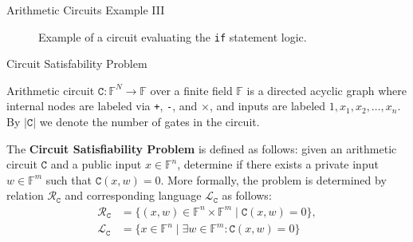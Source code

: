 \documentclass{beamer}
\begin{document}
\begin{frame}[fragile]{Arithmetic Circuits Example III}
\begin{figure}[h!]
            \caption{Example of a circuit evaluating the \texttt{if} statement logic.}
            \label{fig:multivariate-polynomial-circuit}
        \end{figure}
    \end{frame}

    \begin{frame}{Circuit Satisfability Problem}
        \begin{definition}
            Arithmetic circuit $\mathtt{C}: \mathbb{F}^N \to \mathbb{F}$ over a finite field 
            $\mathbb{F}$ is a directed acyclic graph where internal nodes are labeled via 
            \texttt{+}, \texttt{-}, and $\times$, and inputs are labeled $1,x_1,x_2,\dots,x_n$. 
            By $|\mathtt{C}|$ we denote the number of gates in the circuit.
        \end{definition}
        \pause
        \begin{definition}
            The \textbf{Circuit Satisfiability Problem} is defined as follows: given an arithmetic 
            circuit $\mathtt{C}$ and a public input $x \in \mathbb{F}^n$, determine if there exists 
            a private input $w \in \mathbb{F}^m$ such that $\mathtt{C}(x,w) = 0$. More formally, the
            problem is determined by relation $\mathcal{R}_{\texttt{C}}$ and corresponding language
            $\mathcal{L}_{\texttt{C}}$ as follows:
            \begin{align*}
                \mathcal{R}_{\texttt{C}} &= \{(x,w) \in \mathbb{F}^n \times \mathbb{F}^m \; | \; \mathtt{C}(x,w) = 0\},\\ 
                \mathcal{L}_{\texttt{C}} &= \{x \in \mathbb{F}^n \; | \; \exists w \in \mathbb{F}^m: \mathtt{C}(x,w) = 0\}
            \end{align*}
        \end{definition}
    \end{frame}
\end{document}
